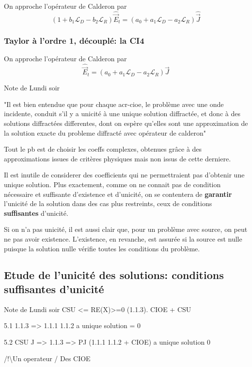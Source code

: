 \documentclass[12pt,%
    twoside,%
    a4paper,%
    openright, %
    ]{book}
\numberwithin{equation}{section} %
\newcommand{\vect}[1]{{\overset{\rightarrow}{#1}}}
\newcommand{\LD}{{\mathcal{L}_D}}
\newcommand{\LR}{{\mathcal{L}_R}}
\newcommand{\vE}{\vect{E}}
\newcommand{\vJ}{\vect{J}}
\newcounter{REM}
\newenvironment{REM}[1][\theREM]
    {%
        \stepcounter{REM}
        \hypertarget{REM#1}{}%
        \pdfbookmark[0]{REM \theREM}{REM#1}
        \begin{tcolorbox}[%
                title={Remarque \theREM},%
                colback=red!30!white,%
                colframe=red!75!black,%
            ]
    }
    {
        \end{tcolorbox}%
    }%
\begin{document}
        On approche l'opérateur de Calderon par
        \[
          ( 1 + b_1 \LD -b_2 \LR )\hat\vE_t = ( a_0 + a_1 \LD -a_2 \LR) \hat \vJ
        \]

      \subsubsection{Taylor à l'ordre 1, découplé: la CI4}

        On approche l'opérateur de Calderon par
        \[
          \hat\vE_t = ( a_0 + a_1 \LD - a_2 \LR ) \hat \vJ
        \]

        \begin{REM}
            Note de Lundi soir

            "Il est bien entendue que pour chaque \gls{acr-cioe}, le problème avec une onde incidente, conduit s'il y a unicité à une unique solution diffractée, et donc à des solutions diffractées differentes, dont on espère qu'elles sont une approximation de la solution exacte du probleme diffracté avec opérateur de calderon"

            Tout le pb est de choisir les coeffs complexes, obtenues grâce à des approximations issues de critères physiques mais non issus de cette derniere. 

            Il est inutile de considerer des coefficients qui ne permettraient pas d'obtenir une unique solution.
            Plus exactement, comme on ne connait pas de condition nécessaire et suffisante d'existence et d'unicité, on se contentera de {\bf garantir} l'unicité de la solution dans des cas plus restreints, ceux de conditions {\bf suffisantes} d'unicité. 
            
            Si on n'a pas unicité, il est aussi clair que, pour un problème avec source, on peut ne pas avoir existence.
            L'existence, en revanche, est assurée si la source est nulle puisque la solution nulle vérifie toutes les conditions du problème.
        \end{REM}

    \subsection{Etude de l'unicité des solutions: conditions suffisantes d'unicité}

        \begin{REM}
            Note de Lundi soir
            CSU <= RE(X)>=0 (1.1.3). CIOE + CSU

            5.1 1.1.3 => 1.1.1 1.1.2 a  unique solution = 0

            5.2 CSU J => 1.1.3 => PJ (1.1.1 1.1.2 + CIOE) a unique solution 0

            /!\textbackslash  Un operateur / Des CIOE
        \end{REM}


\backmatter
\appendix
\printbibliography
\end{document}
